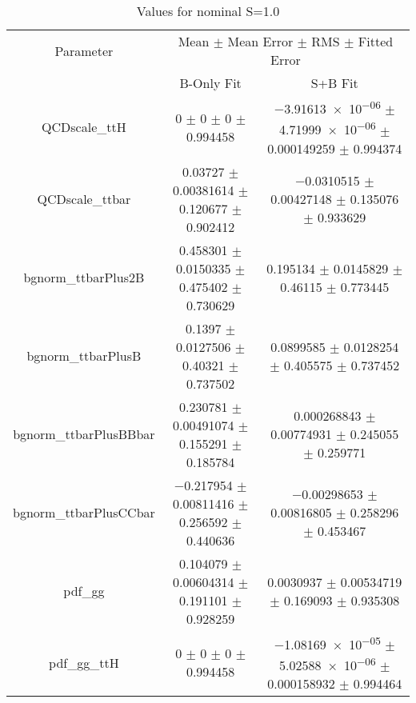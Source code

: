 \begin{table}
\centering
\caption{Values for nominal S=1.0}
\begin{tabular}{ccc}
\toprule
Parameter & \multicolumn{2}{c}{Mean $\pm$ Mean Error $\pm$ RMS $\pm$ Fitted Error}\\
 & B-Only Fit & S+B Fit\\
\midrule
QCDscale\_ttH & \num{0} $\pm$ \num{0} $\pm$ \num{0} $\pm$ \num{0.994458} & \num{-3.91613e-06} $\pm$ \num{4.71999e-06} $\pm$ \num{0.000149259} $\pm$ \num{0.994374}\\
QCDscale\_ttbar & \num{0.03727} $\pm$ \num{0.00381614} $\pm$ \num{0.120677} $\pm$ \num{0.902412} & \num{-0.0310515} $\pm$ \num{0.00427148} $\pm$ \num{0.135076} $\pm$ \num{0.933629}\\
bgnorm\_ttbarPlus2B & \num{0.458301} $\pm$ \num{0.0150335} $\pm$ \num{0.475402} $\pm$ \num{0.730629} & \num{0.195134} $\pm$ \num{0.0145829} $\pm$ \num{0.46115} $\pm$ \num{0.773445}\\
bgnorm\_ttbarPlusB & \num{0.1397} $\pm$ \num{0.0127506} $\pm$ \num{0.40321} $\pm$ \num{0.737502} & \num{0.0899585} $\pm$ \num{0.0128254} $\pm$ \num{0.405575} $\pm$ \num{0.737452}\\
bgnorm\_ttbarPlusBBbar & \num{0.230781} $\pm$ \num{0.00491074} $\pm$ \num{0.155291} $\pm$ \num{0.185784} & \num{0.000268843} $\pm$ \num{0.00774931} $\pm$ \num{0.245055} $\pm$ \num{0.259771}\\
bgnorm\_ttbarPlusCCbar & \num{-0.217954} $\pm$ \num{0.00811416} $\pm$ \num{0.256592} $\pm$ \num{0.440636} & \num{-0.00298653} $\pm$ \num{0.00816805} $\pm$ \num{0.258296} $\pm$ \num{0.453467}\\
pdf\_gg & \num{0.104079} $\pm$ \num{0.00604314} $\pm$ \num{0.191101} $\pm$ \num{0.928259} & \num{0.0030937} $\pm$ \num{0.00534719} $\pm$ \num{0.169093} $\pm$ \num{0.935308}\\
pdf\_gg\_ttH & \num{0} $\pm$ \num{0} $\pm$ \num{0} $\pm$ \num{0.994458} & \num{-1.08169e-05} $\pm$ \num{5.02588e-06} $\pm$ \num{0.000158932} $\pm$ \num{0.994464}\\
\bottomrule
\end{tabular}
\end{table}